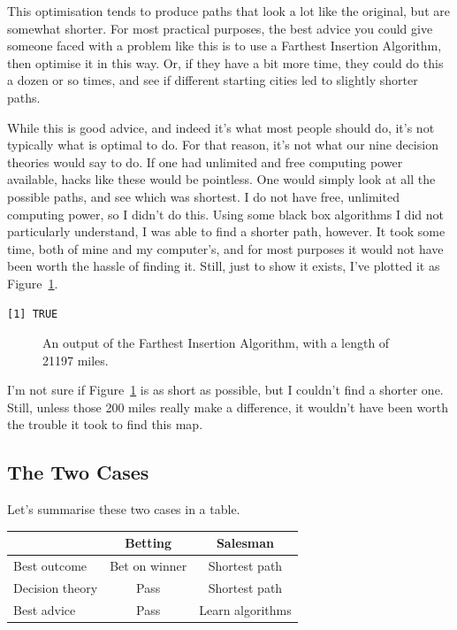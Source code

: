 \documentclass[
  letterpaper,
  DIV=11,
  numbers=noendperiod]{scrartcl}
\begin{document}
This optimisation tends to produce paths that look a lot like the
original, but are somewhat shorter. For most practical purposes, the
best advice you could give someone faced with a problem like this is to
use a Farthest Insertion Algorithm, then optimise it in this way. Or, if
they have a bit more time, they could do this a dozen or so times, and
see if different starting cities led to slightly shorter paths.

While this is good advice, and indeed it's what most people should do,
it's not typically what is optimal to do. For that reason, it's not what
our nine decision theories would say to do. If one had unlimited and
free computing power available, hacks like these would be pointless. One
would simply look at all the possible paths, and see which was shortest.
I do not have free, unlimited computing power, so I didn't do this.
Using some black box algorithms I did not particularly understand, I was
able to find a shorter path, however. It took some time, both of mine
and my computer's, and for most purposes it would not have been worth
the hassle of finding it. Still, just to show it exists, I've plotted it
as Figure~\ref{fig-best}.

\begin{verbatim}
[1] TRUE
\end{verbatim}

\begin{figure}


\caption{\label{fig-best}An output of the Farthest Insertion Algorithm,
with a length of 21197 miles.}

\end{figure}%

I'm not sure if Figure~\ref{fig-best} is as short as possible, but I
couldn't find a shorter one. Still, unless those 200 miles really make a
difference, it wouldn't have been worth the trouble it took to find this
map.

\subsection{The Two Cases}\label{the-two-cases}

Let's summarise these two cases in a table.

\begin{longtable}[]{@{}lcc@{}}
\toprule\noalign{}
& Betting & Salesman \\
\midrule\noalign{}
\endhead
\bottomrule\noalign{}
\endlastfoot
Best outcome & Bet on winner & Shortest path \\
Decision theory & Pass & Shortest path \\
Best advice & Pass & Learn algorithms \\
\end{longtable}
\end{document}
